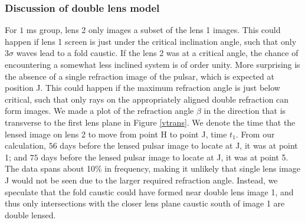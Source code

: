 \documentclass[useAMS,usenatbib]{mn2e}
\begin{document}
\subsubsection{Discussion of double lens model}
For $1$ ms group, lens 2
only images a subset of the lens 1 images.  This could happen if
lens 1 screen is just under the critical inclination
angle, such that only $3\sigma$ waves lead to a fold caustic.  If the lens 2 was at a critical angle, the chance of encountering a
somewhat less inclined system is of order unity.
More surprising is the absence of a single refraction
image of the pulsar, which is expected at position J.  This could
happen if the maximum refraction angle is just below critical, such
that only rays on the appropriately aligned double refraction can form
images.  
We made a plot of the refraction angle $\beta$ in the
direction that is transverse to the first lens plane in Figure
\ref{vtrans}. We denote the time that the lensed image on lens 2 to move from point H to point J, time $t_1$. From our calculation, $56$ days before the lensed pulsar
 image to locate at J, it was at point 1; and $75$ days before the lensed pulsar image to locate at J, it was at point 5.  The data
spans about 10\% in frequency, making it unlikely that single lens
image J would not be seen due to the larger required refraction
angle.  Instead, we speculate that the fold caustic could have formed
near double lens image 1, and thus only intersections with the closer
lens plane caustic south of image 1 are double lensed.
\end{document}
